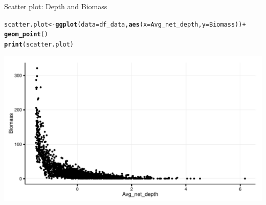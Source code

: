 \documentclass{beamer}\usepackage[]{graphicx}\usepackage[]{color}
\makeatletter
\newcommand{\hlopt}[1]{\textcolor[rgb]{0,0,0}{#1}}%
\newcommand{\hlstd}[1]{\textcolor[rgb]{0.345,0.345,0.345}{#1}}%
\newcommand{\hlkwb}[1]{\textcolor[rgb]{0.69,0.353,0.396}{#1}}%
\newcommand{\hlkwc}[1]{\textcolor[rgb]{0.333,0.667,0.333}{#1}}%
\newcommand{\hlkwd}[1]{\textcolor[rgb]{0.737,0.353,0.396}{\textbf{#1}}}%
\newenvironment{kframe}{%
 \def\at@end@of@kframe{}%
 \ifinner\ifhmode%
  \def\at@end@of@kframe{\end{minipage}}%
  \begin{minipage}{\columnwidth}%
 \fi\fi%
 \def\FrameCommand##1{\hskip\@totalleftmargin \hskip-\fboxsep
 \colorbox{shadecolor}{##1}\hskip-\fboxsep
     \hskip-\linewidth \hskip-\@totalleftmargin \hskip\columnwidth}%
 \MakeFramed {\advance\hsize-\width
   \@totalleftmargin\z@ \linewidth\hsize
   \@setminipage}}%
 {\par\unskip\endMakeFramed%
 \at@end@of@kframe}
\newenvironment{knitrout}{}{} %
\makeatother
\begin{document}
\begin{frame}[fragile]{Scatter plot: Depth and Biomass}
\begin{knitrout}\footnotesize
{}\color{fgcolor}\begin{kframe}
\begin{alltt}
  \hlstd{scatter.plot} \hlkwb{<-} \hlkwd{ggplot}\hlstd{(}\hlkwc{data}\hlstd{=df_data,} \hlkwd{aes}\hlstd{(}\hlkwc{x}\hlstd{=Avg_net_depth,} \hlkwc{y}\hlstd{=Biomass))} \hlopt{+}
                \hlkwd{geom_point}\hlstd{()}
  \hlkwd{print}\hlstd{(scatter.plot)}
\end{alltt}
\end{kframe}

{\centering \includegraphics[width=.9\linewidth]{scatter_plot_base-1} 

}



\end{knitrout}
\end{frame}
\end{document}
